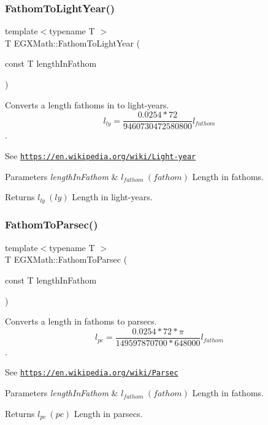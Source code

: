\subsubsection{\texorpdfstring{Fathom\+To\+Light\+Year()}{FathomToLightYear()}}
{\footnotesize\ttfamily template$<$typename T $>$ \\
T E\+G\+X\+Math\+::\+Fathom\+To\+Light\+Year (\begin{DoxyParamCaption}\item[{const T}]{length\+In\+Fathom }\end{DoxyParamCaption})}



Converts a length fathoms in to light-\/years. \[ l_{ly}=\frac{0.0254 * 72}{9460730472580800} l_{fathom} \]. 

See \href{https://en.wikipedia.org/wiki/Light-year}{\tt https\+://en.\+wikipedia.\+org/wiki/\+Light-\/year} 
\begin{DoxyParams}{Parameters}
{\em length\+In\+Fathom} & $ l_{fathom}\ (fathom)$ Length in fathoms. \\
\hline
\end{DoxyParams}
\begin{DoxyReturn}{Returns}
$ l_{ly}\ (ly)$ Length in light-\/years. 
\end{DoxyReturn}
\mbox{\label{group___e_g_x_math-_conversions-_length_conversions-_imperial-_fathom-_astronomical_ga2ab90a2b4e56d3787d12483704d76c2d}} 
\subsubsection{\texorpdfstring{Fathom\+To\+Parsec()}{FathomToParsec()}}
{\footnotesize\ttfamily template$<$typename T $>$ \\
T E\+G\+X\+Math\+::\+Fathom\+To\+Parsec (\begin{DoxyParamCaption}\item[{const T}]{length\+In\+Fathom }\end{DoxyParamCaption})}



Converts a length in fathoms to parsecs. \[ l_{pc}=\frac{0.0254 * 72 * \pi}{149597870700 * 648000} l_{fathom} \]. 

See \href{https://en.wikipedia.org/wiki/Parsec}{\tt https\+://en.\+wikipedia.\+org/wiki/\+Parsec} 
\begin{DoxyParams}{Parameters}
{\em length\+In\+Fathom} & $ l_{fathom}\ (fathom)$ Length in fathoms. \\
\hline
\end{DoxyParams}
\begin{DoxyReturn}{Returns}
$ l_{pc}\ (pc)$ Length in parsecs. 
\end{DoxyReturn}
